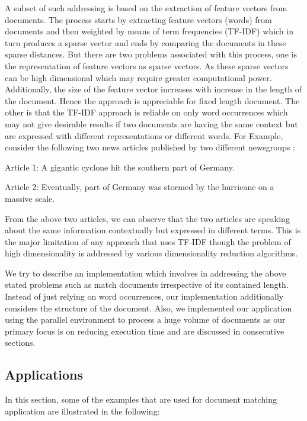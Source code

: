 \par A subset of such addressing is based on the extraction of feature vectors from documents. The process starts by extracting feature vectors (words) from documents and then weighted by means of term frequencies (TF-IDF) which in turn produces a sparse vector and ends by comparing the documents in these sparse distances. But there are two problems associated with this process, one is the representation of feature vectors as sparse vectors. As these sparse vectors can be high dimensional which may require greater computational power. Additionally, the size of the feature vector increases with increase in the length of the document. Hence the approach is appreciable for fixed length document. The other is that the TF-IDF approach is reliable on only word occurrences which may not give desirable results if two documents are having the same context but are expressed with different representations or different words. For Example, consider the following two news articles published by two different newsgroups :
\newline

Article 1: A gigantic cyclone hit the southern part of Germany. 
\newline
\par Article 2: Eventually, part of Germany was stormed by the hurricane on a massive scale.
\newline
\par From the above two articles, we can observe that the two articles are speaking about the same information contextually but expressed in different terms. This is the major limitation of any approach that uses TF-IDF though the problem of high dimensionality is addressed by various dimensionality reduction algorithms. 

\par We try to describe an implementation which involves in addressing the above stated problems such as match documents irrespective of its contained length. Instead of just relying on word occurrences, our implementation additionally considers the structure of the document. Also, we implemented our application using the parallel environment to process a huge volume of documents as our primary focus is on reducing execution time and are discussed in consecutive sections.


\subsection{Applications}
In this section, some of the examples that are used for document matching application are illustrated in the following:

